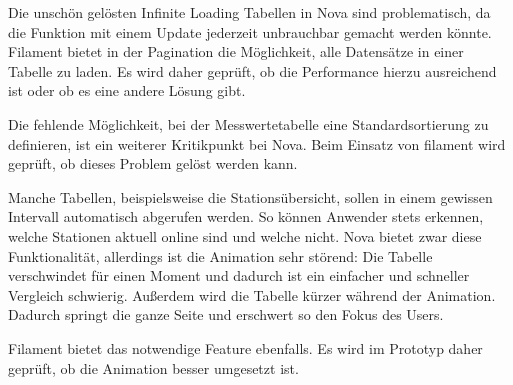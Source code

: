 Die unschön gelösten Infinite Loading Tabellen in Nova sind problematisch, da die Funktion mit einem Update jederzeit unbrauchbar gemacht werden könnte.
Filament bietet in der Pagination die Möglichkeit, alle Datensätze in einer Tabelle zu laden.
Es wird daher geprüft, ob die Performance hierzu ausreichend ist oder ob es eine andere Lösung gibt.

Die fehlende Möglichkeit, bei der Messwertetabelle eine Standardsortierung zu definieren, ist ein weiterer Kritikpunkt bei Nova.
Beim Einsatz von filament wird geprüft, ob dieses Problem gelöst werden kann.

Manche Tabellen, beispielsweise die Stationsübersicht, sollen in einem gewissen Intervall automatisch abgerufen werden.
So können Anwender stets erkennen, welche Stationen aktuell online sind und welche nicht.
Nova bietet zwar diese Funktionalität, allerdings ist die Animation sehr störend:
Die Tabelle verschwindet für einen Moment und dadurch ist ein einfacher und schneller Vergleich schwierig.
Außerdem wird die Tabelle kürzer während der Animation.
Dadurch springt die ganze Seite und erschwert so den Fokus des Users.

Filament bietet das notwendige Feature ebenfalls.
Es wird im Prototyp daher geprüft, ob die Animation besser umgesetzt ist.
